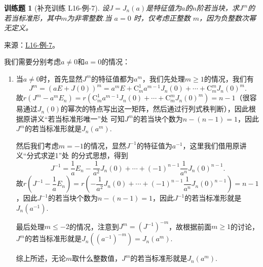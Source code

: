 \documentclass[UTF8,12pt,a4paper,fontset=fandol]{ctexart}
\newtheorem{exercise}{训练题}[section]
\begin{document}
\begin{exercise}[补充训练 L16-例-7]\label{prob:L16-例-7}
设$J=J_n(a)$是特征值为$a$的$n$阶若当块，求$J^m$的若当标准形，其中$m$为非零整数.当 $a=0$ 时，仅考虑正整数 $m$，因为负整数次幂无定义。
\end{exercise}
\noindent 来源：\href{https://github.com/yhwu-is/Linear-Algebra-Left-Undone/blob/new/%E8%AE%B2%E4%B9%89/%E4%B8%93%E9%A2%98/16%20%E8%8B%A5%E5%BD%93%E6%A0%87%E5%87%86%E5%BD%A2.tex}{L16-例-7}。
\begin{solve}
我们需要分别考虑$a\neq 0$和$a=0$的情况：
    \begin{enumerate}
        \item 当$a\neq 0$时，首先显然$J^m$的特征值都为$a^m$，我们先处理$m\geqslant 1$的情况，我们有
              \[J^m=(aE+J(0))^m=a^mE+\mathrm{C}_m^1a^{m-1}J_n(0)+\cdots+\mathrm{C}_m^mJ_n(0)^m.\]
              故$r(J^m-a^mE_n)=r(\mathrm{C}_m^1a^{m-1}J_n(0)+\cdots+\mathrm{C}_m^mJ_n(0)^m)=n-1$（很容易通过$J_n(0)$的幂次的特点写出这一矩阵，然后通过行列式秩判断），因此根据原讲义“若当标准形唯一”处 可知$J^m$的若当块个数为$n-(n-1)=1$，因此$J^m$的若当标准形就是$J_n(a^m)$.

              然后我们考虑$m=-1$的情况，显然$J^{-1}$的特征值为$a^{-1}$，这里我们借用原讲义“分式求逆1”处 的分式思想，得到
              \[J^{-1}=\dfrac{1}{a}E_n-\dfrac{1}{a^2}J_n(0)+\cdots+(-1)^{n-1}\dfrac{1}{a^n}J_n(0)^{n-1}.\]
              故$r(J^{-1}-\dfrac{1}{a}E_n)=r(-\dfrac{1}{a^2}J_n(0)+\cdots+(-1)^{n-1}\dfrac{1}{a^n}J_n(0)^{n-1})=n-1$，因此$J^{-1}$的若当块个数为$n-(n-1)=1$，因此$J^{-1}$的若当标准形就是$J_n(a^{-1})$.

              最后处理$m\leqslant -2$的情况，注意到$J^m=(J^{-1})^{-m}$，故根据前面$m\geqslant 1$的讨论，$J^m$的若当标准形就是$J_n((a^{-1})^{-m})=J_n(a^m)$.

              综上所述，无论$m$取什么整数值，$J^m$的若当标准形就是$J_n(a^m)$.


\end{enumerate}
\end{solve}
\end{document}
